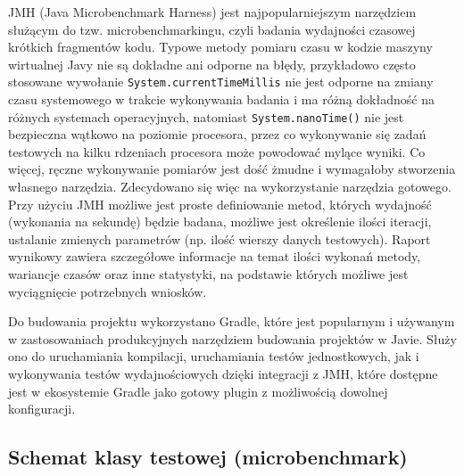 \documentclass[12pt]{extarticle}
\begin{document}
    JMH (Java Microbenchmark Harness) jest najpopularniejszym narzędziem służącym do tzw. microbenchmarkingu, czyli badania wydajności czasowej krótkich fragmentów kodu. Typowe metody pomiaru czasu w kodzie maszyny wirtualnej Javy nie są dokładne ani odporne na błędy, przykładowo często stosowane wywołanie \texttt{System.currentTimeMillis} nie jest odporne na zmiany czasu systemowego w trakcie wykonywania badania i ma różną dokładność na różnych systemach operacyjnych, natomiast \texttt{System.nanoTime()} nie jest bezpieczna wątkowo na poziomie procesora, przez co wykonywanie się zadań testowych na kilku rdzeniach procesora może powodować mylące wyniki. Co więcej, ręczne wykonywanie pomiarów jest dość żmudne i wymagałoby stworzenia własnego narzędzia. Zdecydowano się więc na wykorzystanie narzędzia gotowego. Przy użyciu JMH możliwe jest proste definiowanie metod, których wydajność (wykonania na sekundę) będzie badana, możliwe jest określenie ilości iteracji, ustalanie zmienych parametrów (np. ilość wierszy danych testowych). Raport wynikowy zawiera szczegółowe informacje na temat ilości wykonań metody, wariancje czasów oraz inne statystyki, na podstawie których możliwe jest wyciągnięcie potrzebnych wniosków.

    Do budowania projektu wykorzystano Gradle, które jest popularnym i używanym w zastosowaniach produkcyjnych narzędziem budowania projektów w Javie. Służy ono do uruchamiania kompilacji, uruchamiania testów jednostkowych, jak i wykonywania testów wydajnościowych dzięki integracji z JMH, które dostępne jest w ekosystemie Gradle jako gotowy plugin z możliwością dowolnej konfiguracji.

\subsection{Schemat klasy testowej (microbenchmark)}
\end{document}
